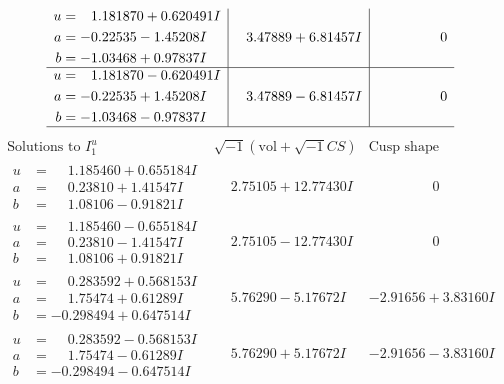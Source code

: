 \documentclass[1p]{elsarticle_modified}
\theoremstyle{definition}
\newcommand{\I}{\sqrt{-1}}
\begin{document}
$$\begin{array}{c|c|c}
\begin{aligned}
u &= \phantom{-}1.181870 + 0.620491 I \\
a &= -0.22535 - 1.45208 I \\
b &= -1.03468 + 0.97837 I\end{aligned}
 & \phantom{-}3.47889 + 6.81457 I & \phantom{-0.000000 } 0 \\ \hline\begin{aligned}
u &= \phantom{-}1.181870 - 0.620491 I \\
a &= -0.22535 + 1.45208 I \\
b &= -1.03468 - 0.97837 I\end{aligned}
 & \phantom{-}3.47889 - 6.81457 I & \phantom{-0.000000 } 0\\
 \hline 
 \end{array}$$\newpage$$\begin{array}{c|c|c}  
\text{Solutions to }I^u_{1}& \I (\text{vol} + \sqrt{-1}CS) & \text{Cusp shape}\\
 \hline 
\begin{aligned}
u &= \phantom{-}1.185460 + 0.655184 I \\
a &= \phantom{-}0.23810 + 1.41547 I \\
b &= \phantom{-}1.08106 - 0.91821 I\end{aligned}
 & \phantom{-}2.75105 + 12.77430 I & \phantom{-0.000000 } 0 \\ \hline\begin{aligned}
u &= \phantom{-}1.185460 - 0.655184 I \\
a &= \phantom{-}0.23810 - 1.41547 I \\
b &= \phantom{-}1.08106 + 0.91821 I\end{aligned}
 & \phantom{-}2.75105 - 12.77430 I & \phantom{-0.000000 } 0 \\ \hline\begin{aligned}
u &= \phantom{-}0.283592 + 0.568153 I \\
a &= \phantom{-}1.75474 + 0.61289 I \\
b &= -0.298494 + 0.647514 I\end{aligned}
 & \phantom{-}5.76290 - 5.17672 I & -2.91656 + 3.83160 I \\ \hline\begin{aligned}
u &= \phantom{-}0.283592 - 0.568153 I \\
a &= \phantom{-}1.75474 - 0.61289 I \\
b &= -0.298494 - 0.647514 I\end{aligned}
 & \phantom{-}5.76290 + 5.17672 I & -2.91656 - 3.83160 I \\ \hline\begin{aligned}

\end{aligned}
\end{array}$$
\end{document}
